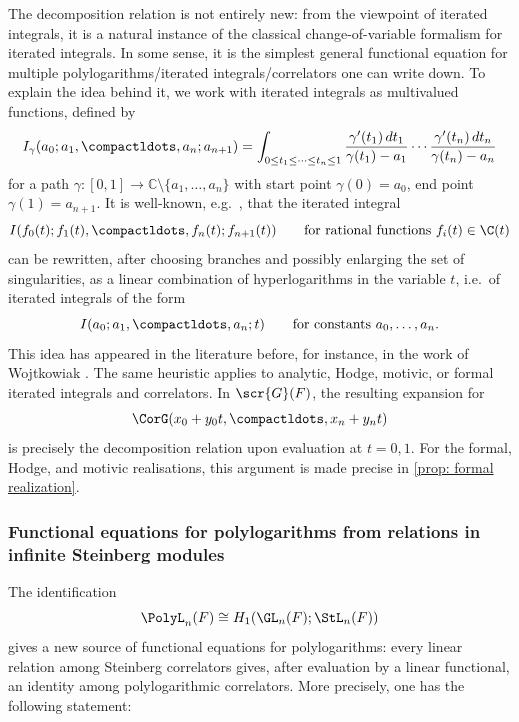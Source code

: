 \documentclass[a4paper]{amsart}
\begin{document}
The decomposition relation is not entirely new: from the viewpoint of
iterated integrals, it is a natural instance of the classical change-of-variable formalism for iterated integrals. In some sense, it is the simplest general functional equation for multiple polylogarithms/iterated integrals/correlators one can write down. To explain the idea behind it, we work with iterated integrals as multivalued functions, defined by 
\[
I_\gamma(a_0;a_1,\compactldots,a_n;a_{n+1})
=
\int_{0\le t_1\le \cdots \le t_n\le 1}
\frac{\gamma'(t_1)\,dt_1}{\gamma(t_1)-a_1}
\cdots
\frac{\gamma'(t_n)\,dt_n}{\gamma(t_n)-a_n}
\]
for a path $\gamma \colon [0,1]\to \mathbb C\setminus\{a_1,\ldots,a_n\}$ with start point $\gamma(0)=a_0$, end point $\gamma(1)=a_{n+1}$. It is well-known, e.g.~\cite[Theorem 2.1]{Gon01}, that the iterated integral
\[
 I(f_0(t);f_1(t),\compactldots,f_n(t);f_{n+1}(t)) \qquad \text{for rational functions $f_i(t)\in \C(t)$}
\] 
can be rewritten, after choosing branches and possibly enlarging the set of singularities, as a linear combination of hyperlogarithms in the variable $t$, i.e.~of iterated integrals of the form
\[
I(a_0;a_1,\compactldots,a_n;t) \qquad \text{for constants $a_0, \ldots,a_{n}$.}
\] 
This idea has appeared in the literature before, for instance, in the work of Wojtkowiak \cite{Wojtkowiak}. The same heuristic applies to analytic, Hodge, motivic, or formal iterated integrals and correlators. In $\scr{G}(F)$, the resulting expansion for
\[
\CorG(x_0+y_0t,\compactldots,x_n+y_nt)
\]
is precisely the decomposition relation upon evaluation at $t=0,1$. For the formal, Hodge, and motivic realisations, this argument is made precise in \cref{prop: formal realization}.


\subsubsection{Functional equations for polylogarithms from relations in
infinite Steinberg modules}

The identification
\[
   \PolyL_n(F)\cong H_1(\GL_n(F);\StL_n(F))
\]
gives a new source of functional equations for polylogarithms: every
linear relation among Steinberg correlators gives, after evaluation by a linear functional, an identity among polylogarithmic correlators. More precisely, one has the following statement:
\end{document}
